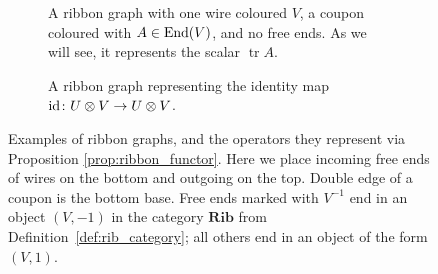 \documentclass{amsart}
\newcommand{\tn}{\textnormal}
\newcommand{\tr}{\operatorname{tr}}
\begin{document}
\begin{figure}
\begin{subfigure}[t]{.45\textwidth}
\caption{A ribbon graph with one wire coloured $V$, a coupon coloured with $A\in\tn{End}(V)$, and no free ends. As we will see, it represents the scalar $\tr A$.}
\label{sfig:rib_tr}
\end{subfigure}
\begin{subfigure}{.45\textwidth}
\centering
{}
\caption{A ribbon graph representing the identity map $\tn{id}\colon U\otimes V\to U\otimes V$.}
\end{subfigure}
\caption{Examples of ribbon graphs, and the operators they represent via Proposition \ref{prop:ribbon_functor}. Here we place incoming free ends of wires on the bottom and outgoing on the top. Double edge of a coupon is the bottom base. Free ends marked with $V^{-1}$ end in an object $(V,-1)$ in the category $\mathbf{Rib}$ from Definition~\ref{def:rib_category}; all others end in an object of the form $(V,1)$.}
\label{fig:ribbon_examples}
\end{figure}
\end{document}
